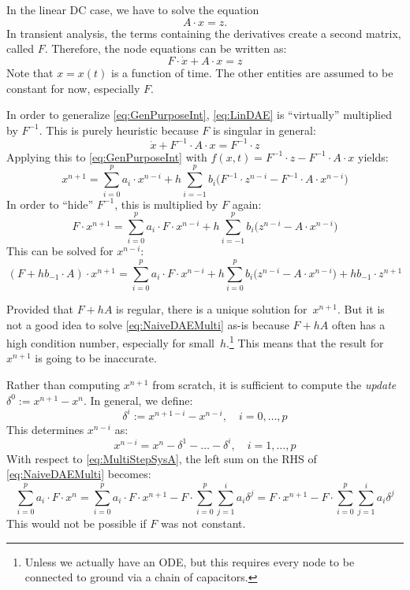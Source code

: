 In the linear DC case, we have to solve the equation
\begin{equation}
A\cdot x = z.
\end{equation}
In transient analysis, the terms containing the derivatives create a
second matrix, called $F$.  Therefore, the node equations can be
written as:
\begin{equation}
\label{eq:LinDAE}
F\cdot\dot{x}+A\cdot x = z
\end{equation}
Note that $x=x(t)$ is a function of time.  The other entities are
assumed to be constant for now, especially $F$.

In order to generalize \eqref{eq:GenPurposeInt}, \eqref{eq:LinDAE} is
``virtually'' multiplied by $F^{-1}$.  This is purely heuristic
because $F$ is singular in general:
\begin{equation}
\dot{x}+F^{-1}\cdot A\cdot x = F^{-1}\cdot z
\end{equation}
Applying this to \eqref{eq:GenPurposeInt} with
$f(x,t)=F^{-1}\cdot z-F^{-1}\cdot A\cdot x$ yields:
\begin{equation}
x^{n+1} = \sum^p_{i=0} a_i\cdot x^{n-i} + h \sum^p_{i=-1} b_i\bigl(
F^{-1}\cdot z^{n-i}-F^{-1}\cdot A\cdot x^{n-i} \bigr)
\end{equation}
In order to ``hide'' $F^{-1}$, this is multiplied by $F$ again:
\begin{equation}
F\cdot x^{n+1} = \sum^p_{i=0} a_i\cdot F\cdot x^{n-i}
+ h \sum^p_{i=-1}  b_i\bigl(
z^{n-i}-A\cdot x^{n-i} \bigr)
\end{equation}
This can be solved for $x^{n-i}$:
\begin{equation}
\label{eq:NaiveDAEMulti}
(F+hb_{-1}\cdot A)\cdot x^{n+1} = \sum^p_{i=0} a_i\cdot F\cdot x^{n-i}
+ h \sum^p_{i=0} b_i \bigl(
z^{n-i}-A\cdot x^{n-i} \bigr) + hb_{-1}\cdot z^{n+1}
\end{equation}

Provided that $F+hA$ is regular, there is a unique solution
for~$x^{n+1}$.  But it is not a good idea to solve
\eqref{eq:NaiveDAEMulti} as-is because $F+hA$ often has a high
condition number, especially for small~$h$.\footnote{Unless we
  actually have an ODE, but this requires every node to be connected
  to ground via a chain of capacitors.}
This means that the result for~$x^{n+1}$ is going to be inaccurate.

Rather than computing $x^{n+1}$ from scratch, it is sufficient to
compute the \emph{update} $\delta^0:= x^{n+1}-x^n$.  In
general, we define:
\[ \delta^i := x^{n+1-i}-x^{n-i},\quad
   i=0,\dotsc,p \]
This determines $x^{n-i}$ as:
\[ x^{n-i} = x^{n} - \delta^1 - \ldots - \delta^i,\quad
   i=1,\dotsc,p \]
With respect to \eqref{eq:MultiStepSysA}, the left sum on the RHS of
\eqref{eq:NaiveDAEMulti} becomes:
\[
\sum^p_{i=0} a_i\cdot F\cdot x^{n}
=\sum^p_{i=0} a_i\cdot F\cdot x^{n+1}
 - F\cdot \sum^p_{i=0} \sum^i_{j=1} a_i \delta^j
=F\cdot x^{n+1}
 - F\cdot \sum^p_{i=0} \sum^i_{j=1} a_i \delta^j
\]
This would not be possible if $F$ was not constant.

